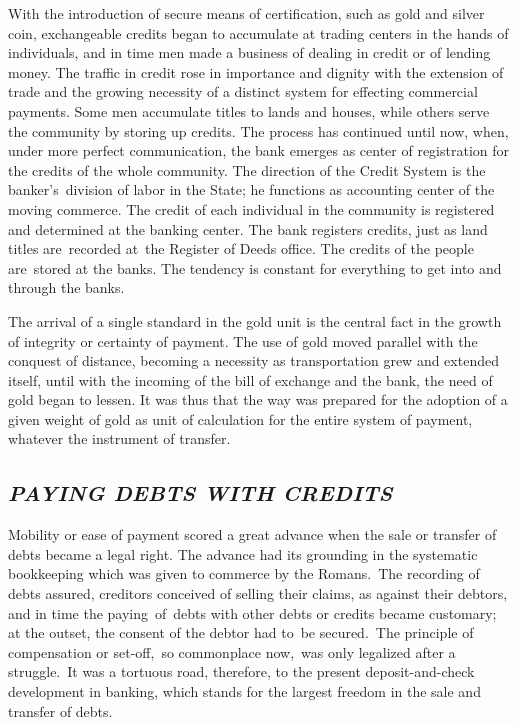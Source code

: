 \documentclass[twoside,symmetric,nobib,justified]{tufte-book}
\begin{document}
With the introduction of secure means of certification, such as gold and
silver coin, exchangeable credits began to accumulate at trading centers
in the hands of individuals, and in time men made a business of dealing
in credit or of lending money. The traffic in credit rose in importance
and dignity with the extension of trade and the growing necessity of a
distinct system for effecting commercial payments. Some men accumulate
titles to lands and houses, while others serve the community by storing
up credits. The process has continued until now, when, under more
perfect communication, the bank emerges as center of registration for
the credits of the whole community. The direction of the Credit System
is the banker's~division of labor in the State; he functions as
accounting center of the moving commerce. The credit of each individual
in the community is registered and determined at the banking center. The
bank registers credits, just as land titles are~recorded at~the Register
of Deeds office. The credits of the people are~stored at the banks. The
tendency is constant for everything to get into and through the banks.~

The arrival of a single standard in the gold unit is the central fact in
the growth of integrity or certainty of payment. The use of gold moved
parallel with the conquest of distance, becoming a necessity as
transportation grew and extended itself, until with the incoming of the
bill of exchange and the bank, the need of gold began to lessen. It was
thus that the way was prepared for the adoption of a given weight of
gold as unit of calculation for the entire system of payment, whatever
the instrument of transfer.~

\hypertarget{paying-debts-with-credits}{%
\subsection{\texorpdfstring{\emph{PAYING DEBTS WITH
CREDITS}}{PAYING DEBTS WITH CREDITS}}\label{paying-debts-with-credits}}

Mobility or ease of payment scored a great advance when the sale or
transfer of debts became a legal right. The advance had its grounding in
the systematic bookkeeping which was given to commerce by the
Romans.~The recording of debts assured, creditors conceived of selling
their claims, as against their debtors, and in time the paying~of~debts
with other debts or credits became customary; at the outset, the consent
of the debtor had to~be secured.~The principle of compensation or
set-off,~so commonplace now,~was only legalized after a struggle.~It was
a tortuous road, therefore, to the present deposit-and-check development
in banking, which stands for the largest freedom in the sale and
transfer of debts.~
\end{document}

